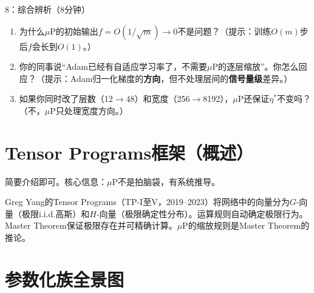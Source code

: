 \documentclass[11pt,a4paper]{article}
\begin{document}
\begin{classexercise}{8：综合辨析（8分钟）}
\begin{enumerate}[label=(\alph*)]
\item 为什么$\mu$P的初始输出$f=O(1/\sqrt{m})\to 0$不是问题？（提示：训练$O(m)$步后$f$会长到$O(1)$。）
\item 你的同事说``Adam已经有自适应学习率了，不需要$\mu$P的逐层缩放''。你怎么回应？（提示：Adam归一化梯度的\textbf{方向}，但不处理层间的\textbf{信号量级}差异。）
\item 如果你同时改了层数（12$\to$48）和宽度（256$\to$8192），$\mu$P还保证$\eta^*$不变吗？（不，$\mu$P只处理宽度方向。）
\end{enumerate}
\end{classexercise}

\section{Tensor Programs框架（概述）}

\begin{teachingtip}
简要介绍即可。核心信息：$\mu$P不是拍脑袋，有系统推导。
\end{teachingtip}

Greg Yang的Tensor Programs（TP-I至V，2019--2023）将网络中的向量分为$G$-向量（极限i.i.d.高斯）和$H$-向量（极限确定性分布）。运算规则自动确定极限行为。Master Theorem保证极限存在并可精确计算。$\mu$P的缩放规则是Master Theorem的推论。

\section{参数化族全景图}
\end{document}
